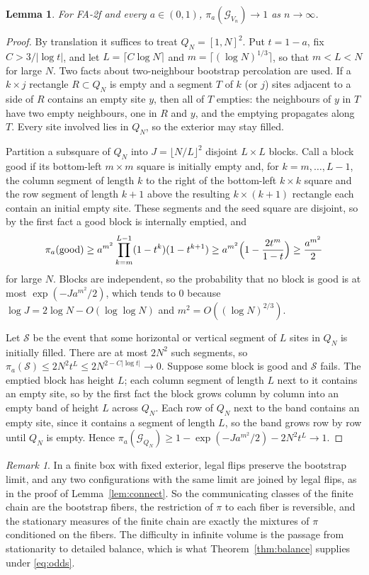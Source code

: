 \documentclass[11pt]{amsart}
\newtheorem{lemma}[theorem]{Lemma}
\theoremstyle{remark}
\newtheorem{remark}[theorem]{Remark}
\begin{document}
\begin{lemma}\label{lem:fa2f}
For FA-2f and every $a\in(0,1)$, $\pi_a(\mathcal G_{V_n})\to1$ as $n\to\infty$.
\end{lemma}

\begin{proof}
By translation it suffices to treat $Q_N=[1,N]^2$. Put $t=1-a$, fix $C>3/|\log t|$, and let $L=\lceil C\log N\rceil$
and $m=\lceil(\log N)^{1/3}\rceil$, so that $m<L<N$ for large $N$. Two facts about two-neighbour bootstrap percolation
are used. If a $k\times j$ rectangle $R\subset Q_N$ is empty and a segment $T$ of $k$ (or $j$) sites adjacent to a
side of $R$ contains an empty site $y$, then all of $T$ empties: the neighbours of $y$ in $T$ have two empty neighbours,
one in $R$ and $y$, and the emptying propagates along $T$. Every site involved lies in $Q_N$, so the exterior may stay
filled.

Partition a subsquare of $Q_N$ into $J=\lfloor N/L\rfloor^2$ disjoint $L\times L$ blocks. Call a block good if its
bottom-left $m\times m$ square is initially empty and, for $k=m,\dots,L-1$, the column segment of length $k$ to the
right of the bottom-left $k\times k$ square and the row segment of length $k+1$ above the resulting $k\times(k+1)$
rectangle each contain an initial empty site. These segments and the seed square are disjoint, so by the first fact a
good block is internally emptied, and
\[
\pi_a(\text{good})\ge a^{m^2}\prod_{k=m}^{L-1}(1-t^k)(1-t^{k+1})\ge a^{m^2}\Bigl(1-\frac{2t^m}{1-t}\Bigr)\ge\frac{a^{m^2}}2
\]
for large $N$. Blocks are independent, so the probability that no block is good is at most
$\exp(-Ja^{m^2}/2)$, which tends to $0$ because $\log J=2\log N-O(\log\log N)$ and $m^2=O((\log N)^{2/3})$.

Let $\mathcal S$ be the event that some horizontal or vertical segment of $L$ sites in $Q_N$ is initially filled. There
are at most $2N^2$ such segments, so $\pi_a(\mathcal S)\le2N^2t^L\le2N^{2-C|\log t|}\to0$. Suppose some block is good
and $\mathcal S$ fails. The emptied block has height $L$; each column segment of length $L$ next to it contains an
empty site, so by the first fact the block grows column by column into an empty band of height $L$ across $Q_N$. Each
row of $Q_N$ next to the band contains an empty site, since it contains a segment of length $L$, so the band grows row
by row until $Q_N$ is empty. Hence $\pi_a(\mathcal G_{Q_N})\ge1-\exp(-Ja^{m^2}/2)-2N^2t^L\to1$.
\end{proof}

\begin{remark}\label{rem:finite}
In a finite box with fixed exterior, legal flips preserve the bootstrap limit, and any two configurations with the
same limit are joined by legal flips, as in the proof of Lemma~\ref{lem:connect}. So the communicating classes of the
finite chain are the bootstrap fibers, the restriction of $\pi$ to each fiber is reversible, and the stationary
measures of the finite chain are exactly the mixtures of $\pi$ conditioned on the fibers. The difficulty in infinite
volume is the passage from stationarity to detailed balance, which is what Theorem~\ref{thm:balance} supplies under
\eqref{eq:odds}.
\end{remark}
\end{document}
